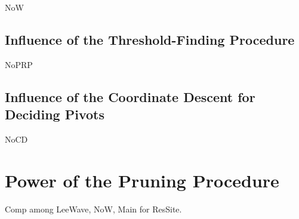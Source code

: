NoW

\subsection{Influence of the Threshold-Finding Procedure} %
\label{sub:influence_of_the_threshold_finding_procedure}

NoPRP

\subsection{Influence of the Coordinate Descent for Deciding Pivots} %
\label{sub:influence_of_the_decision_of_pivots}

NoCD


\section{Power of the Pruning Procedure} %
\label{s:power_of_the_pruning_procedure}

Comp among LeeWave, NoW, Main for ResSite.




%
%